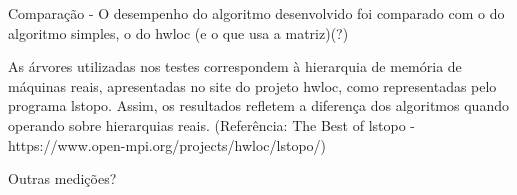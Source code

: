 Comparação - O desempenho do algoritmo desenvolvido foi comparado com o do algoritmo simples, o do hwloc (e o que usa a matriz)(?)

As árvores utilizadas nos testes correspondem à hierarquia de memória de máquinas reais, apresentadas no site do projeto hwloc, como representadas pelo programa lstopo.
Assim, os resultados refletem a diferença dos algoritmos quando operando sobre hierarquias reais.
(Referência: The Best of lstopo - https://www.open-mpi.org/projects/hwloc/lstopo/)

Outras medições?
